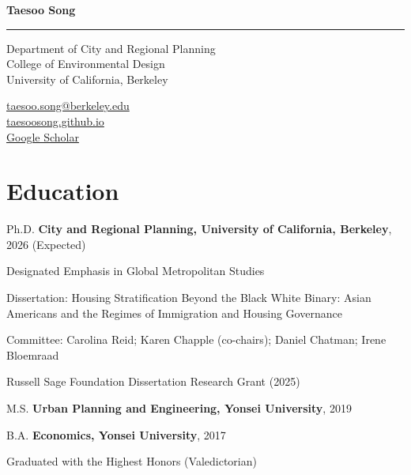 \documentclass[11pt,letterpaper]{article}
\newcommand{\term}[1]{(#1)}
\newcommand{\namefont}[1]{{\normalfont\bfseries\Huge #1}}
\begin{document}
\raggedright

\namefont{Taesoo Song}
\noindent\rule{\linewidth}{0.8pt}

\begin{minipage}[t]{0.66\textwidth}
Department of City and Regional Planning\\
College of Environmental Design\\
University of California, Berkeley
\end{minipage}
\begin{minipage}[t]{0.33\textwidth}
\raggedleft
\href{mailto:taesoo.song@berkeley.edu}{taesoo.song@berkeley.edu}\\
\href{https://taesoosong.github.io}{taesoosong.github.io}\\
\href{https://scholar.google.com/citations?user=xM5Rc-EAAAAJ}{Google Scholar}
\end{minipage}

\section{Education}
\begin{tablist}
  \item[Ph.D.] \tab{}\textbf{City and Regional Planning, University of California, Berkeley}, 2026 (Expected)
    \begin{subpoints}
      \item Designated Emphasis in Global Metropolitan Studies
    \end{subpoints}
    \begin{subpoints2}
      \item Dissertation: Housing Stratification Beyond the Black White Binary: Asian Americans and the Regimes of Immigration and Housing Governance
      \item Committee: Carolina Reid; Karen Chapple (co-chairs); Daniel Chatman; Irene Bloemraad
      \item Russell Sage Foundation Dissertation Research Grant \term{2025}%
    \end{subpoints2}

  \item[M.S.] \tab{}\textbf{Urban Planning and Engineering, Yonsei University}, 2019

  \item[B.A.] \tab{}\textbf{Economics, Yonsei University}, 2017
    \begin{subpoints}
      \item Graduated with the Highest Honors \term{Valedictorian}
    \end{subpoints}
\end{tablist}
\end{document}
